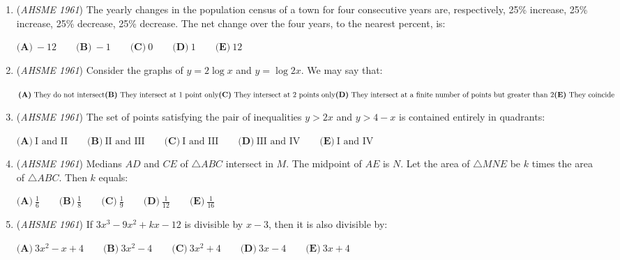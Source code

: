 \begin{enumerate}
 $\textbf{(A)}\ 2\qquad \textbf{(B)}\ 5\qquad \textbf{(C)}\ 7\qquad \textbf{(D)}\ 8\qquad \textbf{(E)}\ 12$


	\item (\textit{AHSME 1961}) The yearly changes in the population census of a town for four consecutive years are, 
respectively, 25\% increase, 25\% increase, 25\% decrease, 25\% decrease. 
The net change over the four years, to the nearest percent, is:


 $\textbf{(A)}\ -12 \qquad \textbf{(B)}\ -1 \qquad \textbf{(C)}\ 0 \qquad \textbf{(D)}\ 1\qquad \textbf{(E)}\ 12$


	\item (\textit{AHSME 1961}) Consider the graphs of $y=2\log{x}$ and $y=\log{2x}$. We may say that:


 $\textbf{(A)}\ \text{They do not intersect}\qquad \\ \textbf{(B)}\ \text{They intersect at 1 point only}\qquad \\ \textbf{(C)}\ \text{They intersect at 2 points only} \qquad \\ \textbf{(D)}\ \text{They intersect at a finite number of points but greater than 2} \qquad \\ \textbf{(E)}\ \text{They coincide}$


	\item (\textit{AHSME 1961}) The set of points satisfying the pair of inequalities $y>2x$ and $y>4-x$ is contained entirely in quadrants:


 $\textbf{(A)}\ \text{I and II}\qquad \textbf{(B)}\ \text{II and III}\qquad \textbf{(C)}\ \text{I and III}\qquad \textbf{(D)}\ \text{III and IV}\qquad \textbf{(E)}\ \text{I and IV}$


	\item (\textit{AHSME 1961}) Medians $AD$ and $CE$ of $\triangle ABC$ intersect in $M$. The midpoint of $AE$ is $N$. 
Let the area of $\triangle MNE$ be $k$ times the area of $\triangle ABC$. Then $k$ equals:


 $\textbf{(A)}\ \frac{1}{6}\qquad \textbf{(B)}\ \frac{1}{8}\qquad \textbf{(C)}\ \frac{1}{9}\qquad \textbf{(D)}\ \frac{1}{12}\qquad \textbf{(E)}\ \frac{1}{16}$


	\item (\textit{AHSME 1961}) If $3x^3-9x^2+kx-12$ is divisible by $x-3$, then it is also divisible by:


 $\textbf{(A)}\ 3x^2-x+4\qquad \textbf{(B)}\ 3x^2-4\qquad \textbf{(C)}\ 3x^2+4\qquad \textbf{(D)}\ 3x-4 \qquad \textbf{(E)}\ 3x+4$



\end{enumerate}
